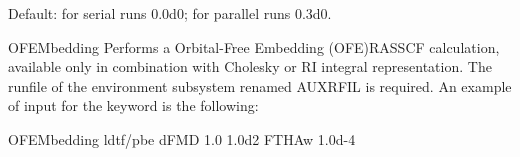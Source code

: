 \begin{keywordlist}
\begin{itemize}
Default: for serial runs 0.0d0; for parallel runs 0.3d0.
\end{itemize}
\item[OFEMbedding]
Performs a Orbital-Free Embedding (OFE)RASSCF calculation, available only in combination with Cholesky or RI integral representation.
The runfile of the environment subsystem renamed AUXRFIL is required.
An example of input for the keyword  is the following:
\begin{inputlisting}

OFEMbedding
 ldtf/pbe
dFMD
 1.0   1.0d2
FTHAw
 1.0d-4


\end{inputlisting}
\end{keywordlist}
